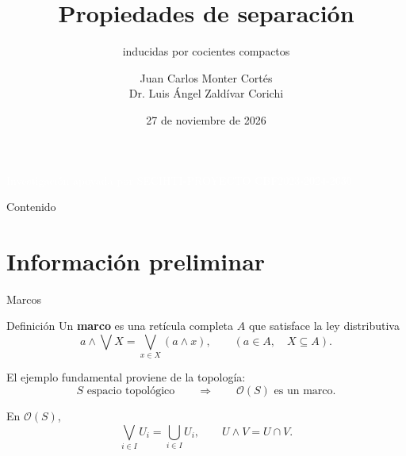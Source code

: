 \documentclass[compress,12pt]{beamer}
\title{Propiedades de separación}
\subtitle{inducidas por cocientes compactos}
\date{27 de noviembre de 2026}
\author{Juan Carlos Monter Cortés\\
Dr. Luis Ángel Zaldívar Corichi}
\institute{Universidad de Guadalajara}
\begin{document}

\begin{frame}[plain]
\titlepage

\vfill
\begin{center}
    \textcolor{white}{\scriptsize Investigación apoyada por SECIHTI-PROYECTO CBF2023-2024-2630}
\end{center}
\end{frame}

\begin{frame}{Contenido}
\tableofcontents
\end{frame}

\section{Información preliminar}
\begin{frame}{Marcos}
\begin{block}{Definición}
Un \textbf{marco} es una retícula completa $A$ que satisface la
ley distributiva
\[
    a\wedge\bigvee X
    =
    \bigvee_{x\in X}(a\wedge x),
    \qquad (a\in A,\quad X\subseteq A).
\]
\end{block}

\pause

\medskip

El ejemplo fundamental proviene de la topología:
\[
\boxed{
    S\text{ espacio topológico}
    \qquad\Longrightarrow\qquad
    \mathcal O(S)\text{ es un marco}.
}
\]

\pause

\medskip

En $\mathcal O(S)$,
\[
    \bigvee_{i\in I}U_i=\bigcup_{i\in I}U_i,
    \qquad
    U\wedge V=U\cap V.
\]
\end{frame}
\end{document}
